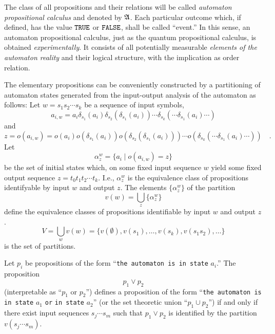 \documentclass{article}
\begin{document}
 The class of all
 propositions and their relations will be called
 {\em automaton propositional calculus}
 and denoted by ${\frak A}$.
 Each particular outcome which, if defined, has the value ${\tt TRUE}$
or
${\tt FALSE}$, shall be called ``event.''
 In this sense, an automaton propositional calculus,  just as the
 quantum propositional calculus, is obtained {\em
 experimentally}.
 It consists of all potentially measurable {\em elements of the
 automaton reality} and their logical structure, with the implication
 as order relation.

The elementary propositions can be conveniently constructed by a
partitioning of automaton states generated from the input-output
analysis of the automaton as follows:
 Let
 $w=s_{1} s_{2} \cdots s_{k}$ be a sequence of input symbols,
 \begin{equation}
 a_{i,w} =
 a_{i}\delta_{s_{1}}(a_{i})\delta_{s_{2}}(\delta_{s_1}
 (a_{i}))\cdots \delta_{s_k}(\cdots \delta_{s_1}(a_{i})\cdots )
 \end{equation}
 and
 \begin{equation}
  z=o(a_{i,w})=
 o(a_{i})o(\delta_{s_{1}}(a_{i}))o(\delta_{s_{2}}(\delta_{s_1}
 (a_{i})))\cdots o(\delta_{s_k}(\cdots \delta_{s_1}(a_{i})\cdots ))\quad
.
 \end{equation}
 Let
 \begin{equation}
 \alpha_z^w=\{ a_i \mid
 o(a_{i,w})=z\}
 \end{equation}
 be the set of initial states which, on some fixed input sequence
 $w$ yield some fixed output
 sequence
 $z=t_{0}t_{1} t_{2} \cdots t_{k}$. I.e.,
 $\alpha_z^w$ is the equivalence class of propositions
 identifyable by input $w$ and output $z$.
 The elements $\{\alpha_z^w\}$ of the partition
 \begin{equation}
 v(w) = \bigcup_z \{ \alpha_z^w \}
 \end{equation}
 define the equivalence classes of propositions identifiable by input
 $w$ and output $z$.
 \begin{equation}
 V= \bigcup_w  v(w)=\{ v(\emptyset ),v(s_1),\ldots
 ,v(s_k),v(s_1s_2),\ldots \}\end{equation}
 is the set of partitions.

 Let $p_i$  be propositions
   of the
  form ``{\tt the automaton is in state} $a_i$.''
 The proposition
 \begin{equation}
 p_1\vee p_2
 \end{equation}
 (interpretable as ``$p_1$ or $p_2$'')
  defines a
 proposition of the
  form ``{\tt the automaton is in state} $a_1$ {\tt or}
 {\tt in state} $a_2$''
 (or the set theoretic union ``$p_1 \cup p_2$'')
 if and only if
 there exist input sequences $s_{j}\cdots s_{m}$
 such that $p_1 \vee p_2$ is
 identified by the partition $v(s_{j}\cdots s_{m})$.
\end{document}
